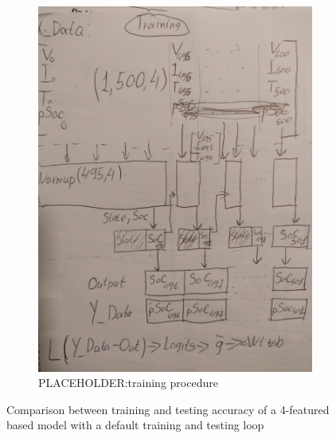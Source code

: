 \begin{figure}[htbp]
\begin{subfigure}[b]{0.45\textwidth}
        \includegraphics[width=\linewidth]{II_Body/images/IMG_20210524_133052.jpg}
        \caption{PLACEHOLDER:training procedure}
        \label{subfig:training}
    \end{subfigure}
    \caption{Comparison between training and testing accuracy of a 4-featured based model with a default training and testing loop}
    \label{fig:training_testing}
\end{figure}

